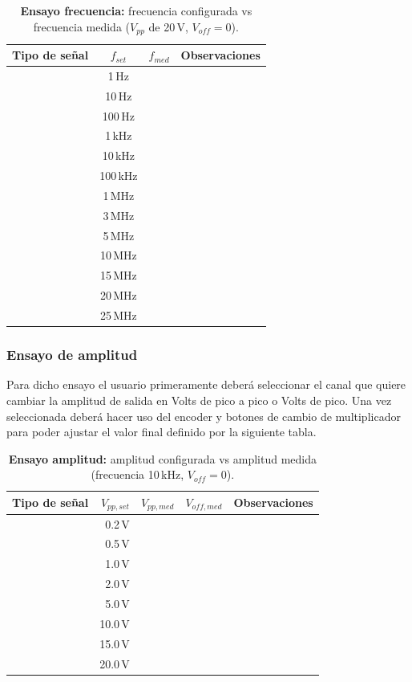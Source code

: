 \begin{table}[H]
	\centering
	\label{tab:freq_set_meas}
	\begin{tabular}{|l|c|r|l|}
		\hline
		Tipo de se\~nal & $f_{set}$ & $f_{med}$ & Observaciones \\ \hline
		& 1\,Hz      &  & \\ \hline
		& 10\,Hz     &  & \\ \hline
		& 100\,Hz    &  & \\ \hline
		& 1\,kHz     &  & \\ \hline
		& 10\,kHz    &  & \\ \hline
		& 100\,kHz   &  & \\ \hline
		& 1\,MHz     &  & \\ \hline
		& 3\,MHz     &  & \\ \hline
		& 5\,MHz     &  & \\ \hline
		& 10\,MHz    &  & \\ \hline
		& 15\,MHz    &  & \\ \hline
		& 20\,MHz    &  & \\ \hline
		& 25\,MHz    &  & \\ \hline
	\end{tabular}
	\caption{\textbf{Ensayo frecuencia:} frecuencia configurada vs frecuencia medida ($V_{pp}$ de 20\,V, $V_{off}=0$).}
\end{table}

\subsubsection{Ensayo de amplitud}
Para dicho ensayo el usuario primeramente deberá seleccionar el canal que quiere cambiar la amplitud de salida en Volts de pico a pico o Volts de pico. Una vez seleccionada deberá hacer uso del encoder y botones de cambio de multiplicador para poder ajustar el valor final definido por la siguiente tabla.

\begin{table}[H]
	\centering
	\label{tab:amp_set_meas}
	\begin{tabular}{|l|r|r|r|l|}
		\hline
		Tipo de se\~nal & $V_{pp,set}$ & $V_{pp,med}$ & $V_{off,med}$ & Observaciones \\ \hline
		& 0.2\,V  &  &  & \\ \hline
		& 0.5\,V  &  &  & \\ \hline
		& 1.0\,V  &  &  & \\ \hline
		& 2.0\,V  &  &  & \\ \hline
		& 5.0\,V  &  &  & \\ \hline
		& 10.0\,V &  &  & \\ \hline
		& 15.0\,V &  &  & \\ \hline
		& 20.0\,V &  &  & \\ \hline
	\end{tabular}
	\caption{\textbf{Ensayo amplitud:} amplitud configurada vs amplitud medida (frecuencia 10\,kHz, $V_{off}=0$).}
\end{table}

